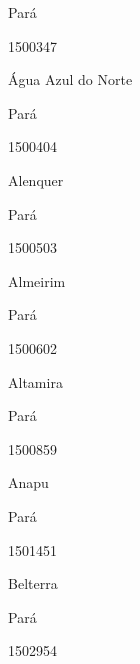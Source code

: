 \documentclass[
  letterpaper,
]{report}
\begin{document}
\n    

\n      

Pará

\n      

1500347

\n      

Água Azul do Norte

\n    

\n    

\n      

Pará

\n      

1500404

\n      

Alenquer

\n    

\n    

\n      

Pará

\n      

1500503

\n      

Almeirim

\n    

\n    

\n      

Pará

\n      

1500602

\n      

Altamira

\n    

\n    

\n      

Pará

\n      

1500859

\n      

Anapu

\n    

\n    

\n      

Pará

\n      

1501451

\n      

Belterra

\n    

\n    

\n      

Pará

\n      

1502954

\n      
\end{document}
